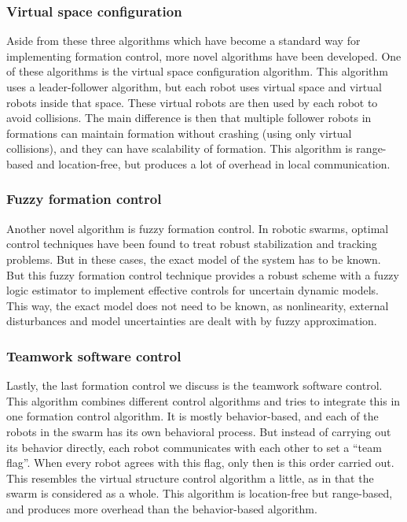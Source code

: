 \subsubsection{Virtual space configuration}
Aside from these three algorithms which have become a standard way for implementing formation control, more novel algorithms have been developed.
One of these algorithms is the virtual space configuration algorithm. \cite{wee2013formation}
This algorithm uses a leader-follower algorithm, but each robot uses virtual space and virtual robots inside that space.
These virtual robots are then used by each robot to avoid collisions.
The main difference is then that multiple follower robots in formations can maintain formation without crashing (using only virtual collisions), and they can have scalability of formation.
This algorithm is range-based and location-free, but produces a lot of overhead in local communication.

\subsubsection{Fuzzy formation control}
Another novel algorithm is fuzzy formation control. \cite{ranjbar2012novel}
In robotic swarms, optimal control techniques have been found to treat robust stabilization and tracking problems.
But in these cases, the exact model of the system has to be known.
But this fuzzy formation control technique provides a robust scheme with a fuzzy logic estimator to implement effective controls for uncertain dynamic models.
This way, the exact model does not need to be known, as nonlinearity, external disturbances and model uncertainties are dealt with by fuzzy approximation.

\subsubsection{Teamwork software control}
Lastly, the last formation control we discuss is the teamwork software control. \cite{kaminka2013use}
This algorithm combines different control algorithms and tries to integrate this in one formation control algorithm.
It is mostly behavior-based, and each of the robots in the swarm has its own behavioral process.
But instead of carrying out its behavior directly, each robot communicates with each other to set a ``team flag''.
When every robot agrees with this flag, only then is this order carried out.
This resembles the virtual structure control algorithm a little, as in that the swarm is considered as a whole.
This algorithm is location-free but range-based, and produces more overhead than the behavior-based algorithm.

